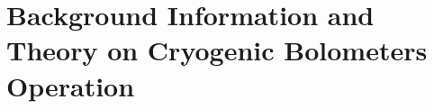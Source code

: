 
\chapter{Background Information and Theory on Cryogenic Bolometers Operation} %

\label{ChapterBiblio} %

